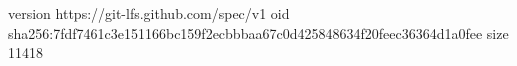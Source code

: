 version https://git-lfs.github.com/spec/v1
oid sha256:7fdf7461c3e151166bc159f2ecbbbaa67c0d425848634f20feec36364d1a0fee
size 11418
